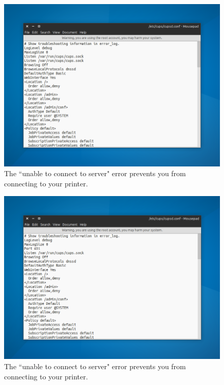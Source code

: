 \documentclass[12pt, a4paper]{article}
\begin{document}
\begin{figure}[!htp]
  \centering
  \includegraphics[width=1\textwidth]{imgs/unable-to-connect-to-server-3.png}
  \caption{The ``unable to connect to server" error prevents you from connecting to your printer.}
  \label{fig13}
\end{figure}




\begin{figure}[!htp]
  \centering
  \includegraphics[width=1\textwidth]{imgs/unable-to-connect-to-server-4.png}
  \caption{The ``unable to connect to server" error prevents you from connecting to your printer.}
  \label{fig14}
\end{figure}
\end{document}
